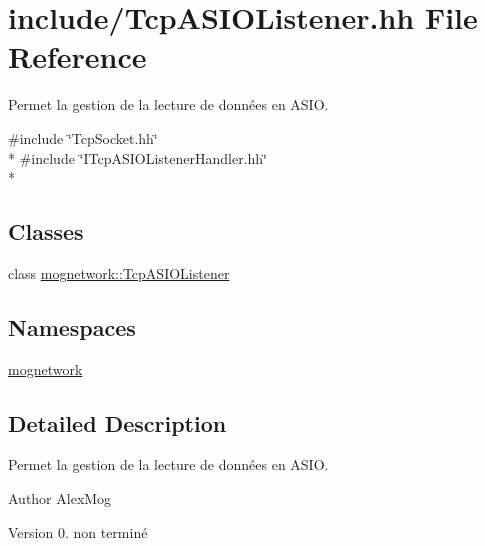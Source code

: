 \hypertarget{_tcp_a_s_i_o_listener_8hh}{\section{include/\-Tcp\-A\-S\-I\-O\-Listener.hh File Reference}
\label{_tcp_a_s_i_o_listener_8hh}
}


Permet la gestion de la lecture de données en A\-S\-I\-O.  


{\ttfamily \#include \char`\"{}Tcp\-Socket.\-hh\char`\"{}}\\*
{\ttfamily \#include \char`\"{}I\-Tcp\-A\-S\-I\-O\-Listener\-Handler.\-hh\char`\"{}}\\*
\subsection*{Classes}
\begin{DoxyCompactItemize}
\item 
class \hyperlink{classmognetwork_1_1_tcp_a_s_i_o_listener}{mognetwork\-::\-Tcp\-A\-S\-I\-O\-Listener}
\end{DoxyCompactItemize}
\subsection*{Namespaces}
\begin{DoxyCompactItemize}
\item 
\hyperlink{namespacemognetwork}{mognetwork}
\end{DoxyCompactItemize}


\subsection{Detailed Description}
Permet la gestion de la lecture de données en A\-S\-I\-O. \begin{DoxyAuthor}{Author}
Alex\-Mog 
\end{DoxyAuthor}
\begin{DoxyVersion}{Version}
0.  non terminé 
\end{DoxyVersion}
